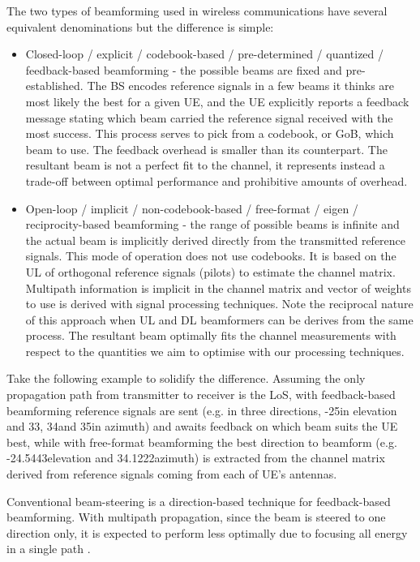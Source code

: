 The two types of beamforming used in wireless communications have several equivalent denominations but the difference is simple:
\begin{itemize}
    \item Closed-loop / explicit / codebook-based / pre-determined / quantized / feedback-based beamforming - the possible beams are fixed and pre-established. The \ac{BS} encodes reference signals in a few beams it thinks are most likely the best for a given \ac{UE}, and the \ac{UE} explicitly reports a feedback message stating which beam carried the reference signal received with the most success. This process serves to pick from a codebook, or \ac{GoB}, which beam to use. The feedback overhead is smaller than its counterpart. The resultant beam is not a perfect fit to the channel, it represents instead a trade-off between optimal performance and prohibitive amounts of overhead. 
    \item Open-loop / implicit / non-codebook-based / free-format / eigen / reciprocity-based beamforming - the range of possible beams is infinite and the actual beam is implicitly derived directly from the transmitted reference signals. This mode of operation does not use codebooks. It is based on the \ac{UL} of orthogonal reference signals (pilots) to estimate the channel matrix. Multipath information is implicit in the channel matrix and vector of weights to use is derived with signal processing techniques. Note the reciprocal nature of this approach when \ac{UL} and \ac{DL} beamformers can be derives from the same process. The resultant beam optimally fits the channel measurements with respect to the quantities we aim to optimise with our processing techniques.
\end{itemize}

Take the following example to solidify the difference. Assuming the only propagation path from transmitter to receiver is the \ac{LoS}, with feedback-based beamforming reference signals are sent (e.g. in three directions, -25\tdeg in elevation and 33\tdeg, 34\tdeg and 35\tdeg in azimuth) and awaits feedback on which beam suits the \ac{UE} best, while with free-format beamforming the best direction to beamform (e.g. -24.5443\tdeg elevation and 34.1222\tdeg azimuth) is extracted from the channel matrix derived from reference signals coming from each of UE's antennas.

Conventional beam-steering \cite{balanis_antennas} is a direction-based technique for feedback-based beamforming. With multipath propagation, since the beam is steered to one direction only, it is expected to perform less optimally due to focusing all energy in a single path \cite{6292865}. 


